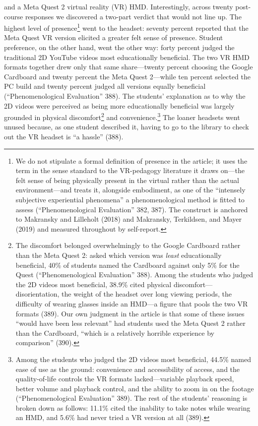 and a Meta Quest 2 virtual reality (VR) HMD. Interestingly, across twenty
post-course responses we discovered a two-part verdict that would not line up.
The highest level of presence\footnote{We do not stipulate a formal definition
of presence in the article; it uses the term in the sense standard to the
VR-pedagogy literature it draws on---the felt sense of being physically present
in the virtual rather than the actual environment---and treats it, alongside
embodiment, as one of the ``intensely subjective experiential phenomena'' a
phenomenological method is fitted to assess (``Phenomenological Evaluation''
382, 387). The construct is anchored to Makransky and Lilleholt (2018) and
Makransky, Terkildsen, and Mayer (2019) and measured throughout by
self-report.} went to the headset: seventy percent reported that the Meta Quest
VR version elicited a greater felt sense of presence. Student preference, on the
other hand, went the other way: forty percent judged the traditional 2D YouTube
videos most educationally beneficial. The two VR HMD formats together drew only
that same share---twenty percent choosing the Google Cardboard and twenty
percent the Meta Quest 2---while ten percent selected the PC build and twenty
percent judged all versions equally beneficial (``Phenomenological Evaluation''
388). The students' explanation as to why the 2D videos were perceived as being
more educationally beneficial was largely grounded in physical
discomfort\footnote{The discomfort belonged overwhelmingly to the Google
Cardboard rather than the Meta Quest 2: asked which version was \textit{least}
educationally beneficial, 40\% of students named the Cardboard against only 5\%
for the Quest (``Phenomenological Evaluation'' 388). Among the students who
judged the 2D videos most beneficial, 38.9\% cited physical
discomfort---disorientation, the weight of the headset over long viewing
periods, the difficulty of wearing glasses inside an HMD---a figure that pools
the two VR formats (389). Our own judgment in the article is that some of these
issues ``would have been less relevant'' had students used the Meta Quest 2
rather than the Cardboard, ``which is a relatively horrible experience by
comparison'' (390).} and convenience.\footnote{Among the students who judged the
2D videos most beneficial, 44.5\% named ease of use as the ground: convenience
and accessibility of access, and the quality-of-life controls the VR formats
lacked---variable playback speed, better volume and playback control, and the
ability to zoom in on the footage (``Phenomenological Evaluation'' 389). The
rest of the students' reasoning is broken down as follows: 11.1\% cited the
inability to take notes while wearing an HMD, and 5.6\% had never tried a VR
version at all (389).} The loaner headsets went unused because, as one student
described it, having to go to the library to check out the VR headset is ``a
hassle'' (388).

